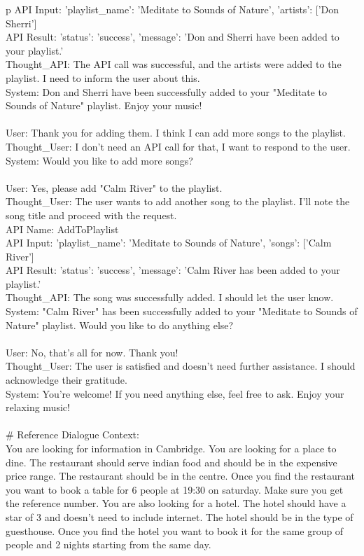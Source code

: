 \begin{table*}
\begin{tabular}{p\linewidth}
API Input: {'playlist\_name': 'Meditate to Sounds of Nature', 'artists': ['Don Sherri']}   \\
API Result: {'status': 'success', 'message': 'Don and Sherri have been added to your playlist.'}   \\
Thought\_API: The API call was successful, and the artists were added to the playlist. I need to inform the user about this.   \\
System: Don and Sherri have been successfully added to your "Meditate to Sounds of Nature" playlist. Enjoy your music!   \\
 \\
User: Thank you for adding them. I think I can add more songs to the playlist. \\
Thought\_User: I don't need an API call for that, I want to respond to the user.  \\
System: Would you like to add more songs?   \\
 \\
User: Yes, please add "Calm River" to the playlist.   \\
Thought\_User: The user wants to add another song to the playlist. I'll note the song title and proceed with the request.   \\
API Name: AddToPlaylist   \\
API Input: {'playlist\_name': 'Meditate to Sounds of Nature', 'songs': ['Calm River']}   \\
API Result: {'status': 'success', 'message': 'Calm River has been added to your playlist.'}   \\
Thought\_API: The song was successfully added. I should let the user know.   \\
System: "Calm River" has been successfully added to your "Meditate to Sounds of Nature" playlist. Would you like to do anything else?   \\
 \\
User: No, that's all for now. Thank you!   \\
Thought\_User: The user is satisfied and doesn't need further assistance. I should acknowledge their gratitude.   \\
System: You're welcome! If you need anything else, feel free to ask. Enjoy your relaxing music! \\
 \\
\# Reference Dialogue Context: \\
You are looking for information in Cambridge. You are looking for a place to dine. The restaurant should serve indian food and should be in the expensive price range. The restaurant should be in the centre. Once you find the restaurant you want to book a table for 6 people at 19:30 on saturday. Make sure you get the reference number. You are also looking for a hotel. The hotel should have a star of 3 and doesn't need to include internet. The hotel should be in the type of guesthouse. Once you find the hotel you want to book it for the same group of people and 2 nights starting from the same day. \\

\end{tabular}
\end{table*}

